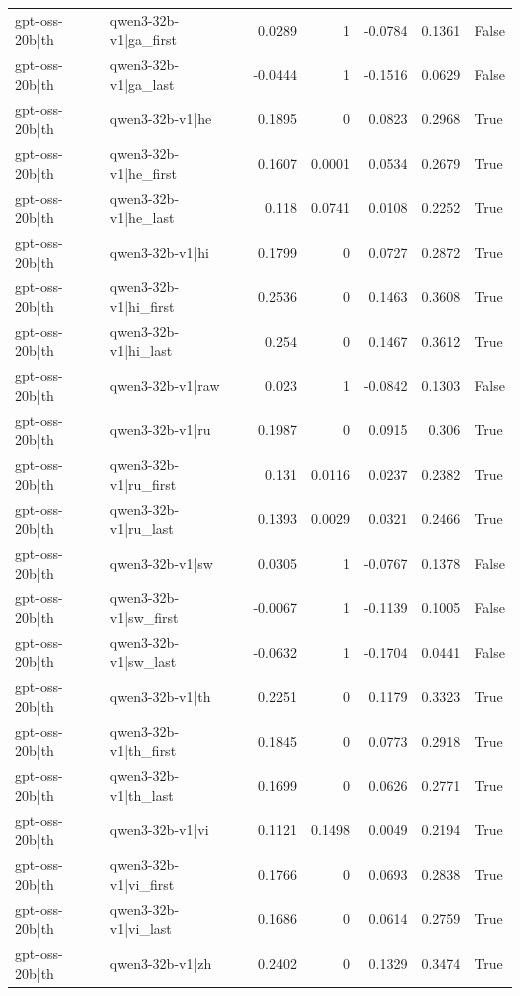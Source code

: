 \begin{table}
\begin{tabular}{l l r r r r l}
gpt-oss-20b|th & qwen3-32b-v1|ga_first & 0.0289 & 1 & -0.0784 & 0.1361 & False \\
gpt-oss-20b|th & qwen3-32b-v1|ga_last & -0.0444 & 1 & -0.1516 & 0.0629 & False \\
gpt-oss-20b|th & qwen3-32b-v1|he & 0.1895 & 0 & 0.0823 & 0.2968 & True \\
gpt-oss-20b|th & qwen3-32b-v1|he_first & 0.1607 & 0.0001 & 0.0534 & 0.2679 & True \\
gpt-oss-20b|th & qwen3-32b-v1|he_last & 0.118 & 0.0741 & 0.0108 & 0.2252 & True \\
gpt-oss-20b|th & qwen3-32b-v1|hi & 0.1799 & 0 & 0.0727 & 0.2872 & True \\
gpt-oss-20b|th & qwen3-32b-v1|hi_first & 0.2536 & 0 & 0.1463 & 0.3608 & True \\
gpt-oss-20b|th & qwen3-32b-v1|hi_last & 0.254 & 0 & 0.1467 & 0.3612 & True \\
gpt-oss-20b|th & qwen3-32b-v1|raw & 0.023 & 1 & -0.0842 & 0.1303 & False \\
gpt-oss-20b|th & qwen3-32b-v1|ru & 0.1987 & 0 & 0.0915 & 0.306 & True \\
gpt-oss-20b|th & qwen3-32b-v1|ru_first & 0.131 & 0.0116 & 0.0237 & 0.2382 & True \\
gpt-oss-20b|th & qwen3-32b-v1|ru_last & 0.1393 & 0.0029 & 0.0321 & 0.2466 & True \\
gpt-oss-20b|th & qwen3-32b-v1|sw & 0.0305 & 1 & -0.0767 & 0.1378 & False \\
gpt-oss-20b|th & qwen3-32b-v1|sw_first & -0.0067 & 1 & -0.1139 & 0.1005 & False \\
gpt-oss-20b|th & qwen3-32b-v1|sw_last & -0.0632 & 1 & -0.1704 & 0.0441 & False \\
gpt-oss-20b|th & qwen3-32b-v1|th & 0.2251 & 0 & 0.1179 & 0.3323 & True \\
gpt-oss-20b|th & qwen3-32b-v1|th_first & 0.1845 & 0 & 0.0773 & 0.2918 & True \\
gpt-oss-20b|th & qwen3-32b-v1|th_last & 0.1699 & 0 & 0.0626 & 0.2771 & True \\
gpt-oss-20b|th & qwen3-32b-v1|vi & 0.1121 & 0.1498 & 0.0049 & 0.2194 & True \\
gpt-oss-20b|th & qwen3-32b-v1|vi_first & 0.1766 & 0 & 0.0693 & 0.2838 & True \\
gpt-oss-20b|th & qwen3-32b-v1|vi_last & 0.1686 & 0 & 0.0614 & 0.2759 & True \\
gpt-oss-20b|th & qwen3-32b-v1|zh & 0.2402 & 0 & 0.1329 & 0.3474 & True \\

\end{tabular}
\end{table}
